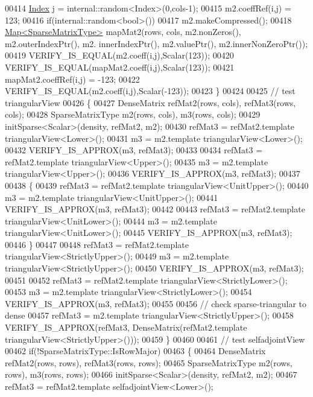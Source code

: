 \begin{DoxyCode}
00414     \hyperlink{namespace_eigen_a62e77e0933482dafde8fe197d9a2cfde}{Index} j = internal::random<Index>(0,cols-1);
00415     m2.coeffRef(i,j) = 123;
00416     \textcolor{keywordflow}{if}(internal::random<bool>())
00417       m2.makeCompressed();
00418     \hyperlink{group___core___module_class_eigen_1_1_map}{Map<SparseMatrixType>} mapMat2(rows, cols, m2.nonZeros(), m2.outerIndexPtr(), m2.
      innerIndexPtr(), m2.valuePtr(),  m2.innerNonZeroPtr());
00419     VERIFY\_IS\_EQUAL(m2.coeff(i,j),Scalar(123));
00420     VERIFY\_IS\_EQUAL(mapMat2.coeff(i,j),Scalar(123));
00421     mapMat2.coeffRef(i,j) = -123;
00422     VERIFY\_IS\_EQUAL(m2.coeff(i,j),Scalar(-123));
00423   \}
00424 
00425   \textcolor{comment}{// test triangularView}
00426   \{
00427     DenseMatrix refMat2(rows, cols), refMat3(rows, cols);
00428     SparseMatrixType m2(rows, cols), m3(rows, cols);
00429     initSparse<Scalar>(density, refMat2, m2);
00430     refMat3 = refMat2.template triangularView<Lower>();
00431     m3 = m2.template triangularView<Lower>();
00432     VERIFY\_IS\_APPROX(m3, refMat3);
00433 
00434     refMat3 = refMat2.template triangularView<Upper>();
00435     m3 = m2.template triangularView<Upper>();
00436     VERIFY\_IS\_APPROX(m3, refMat3);
00437 
00438     \{
00439       refMat3 = refMat2.template triangularView<UnitUpper>();
00440       m3 = m2.template triangularView<UnitUpper>();
00441       VERIFY\_IS\_APPROX(m3, refMat3);
00442 
00443       refMat3 = refMat2.template triangularView<UnitLower>();
00444       m3 = m2.template triangularView<UnitLower>();
00445       VERIFY\_IS\_APPROX(m3, refMat3);
00446     \}
00447 
00448     refMat3 = refMat2.template triangularView<StrictlyUpper>();
00449     m3 = m2.template triangularView<StrictlyUpper>();
00450     VERIFY\_IS\_APPROX(m3, refMat3);
00451 
00452     refMat3 = refMat2.template triangularView<StrictlyLower>();
00453     m3 = m2.template triangularView<StrictlyLower>();
00454     VERIFY\_IS\_APPROX(m3, refMat3);
00455 
00456     \textcolor{comment}{// check sparse-triangular to dense}
00457     refMat3 = m2.template triangularView<StrictlyUpper>();
00458     VERIFY\_IS\_APPROX(refMat3, DenseMatrix(refMat2.template triangularView<StrictlyUpper>()));
00459   \}
00460   
00461   \textcolor{comment}{// test selfadjointView}
00462   \textcolor{keywordflow}{if}(!SparseMatrixType::IsRowMajor)
00463   \{
00464     DenseMatrix refMat2(rows, rows), refMat3(rows, rows);
00465     SparseMatrixType m2(rows, rows), m3(rows, rows);
00466     initSparse<Scalar>(density, refMat2, m2);
00467     refMat3 = refMat2.template selfadjointView<Lower>();

\end{DoxyCode}
